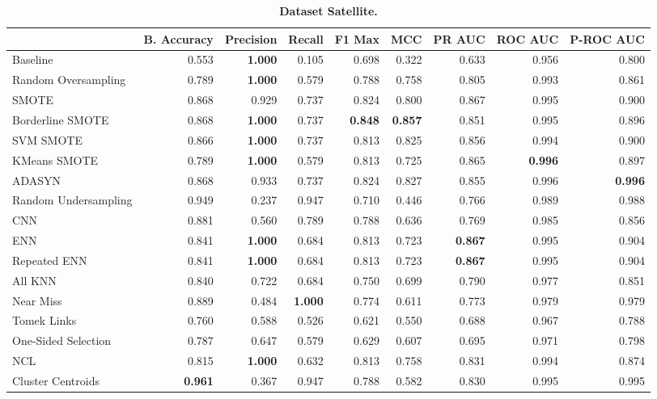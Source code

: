 \begin{table}[H]
    \centering
    \setlength\tabcolsep{2pt}
    \begin{tabularx}{\textwidth}{lRRRRRRRR}
        & B. Accuracy & Precision & Recall & F1 Max & MCC & PR AUC & ROC AUC & P-ROC AUC \\
        \midrule
        Baseline & 0.553 & \textbf{1.000} & 0.105 & 0.698 & 0.322 & 0.633 & 0.956 & 0.800 \\
        Random Oversampling & 0.789 & \textbf{1.000} & 0.579 & 0.788 & 0.758 & 0.805 & 0.993 & 0.861 \\
        SMOTE & 0.868 & 0.929 & 0.737 & 0.824 & 0.800 & 0.867 & 0.995 & 0.900 \\
        Borderline SMOTE & 0.868 & \textbf{1.000} & 0.737 & \textbf{0.848} & \textbf{0.857} & 0.851 & 0.995 & 0.896 \\
        SVM SMOTE & 0.866 & \textbf{1.000} & 0.737 & 0.813 & 0.825 & 0.856 & 0.994 & 0.900 \\
        KMeans SMOTE & 0.789 & \textbf{1.000} & 0.579 & 0.813 & 0.725 & 0.865 & \textbf{0.996} & 0.897 \\
        ADASYN & 0.868 & 0.933 & 0.737 & 0.824 & 0.827 & 0.855 & 0.996 & \textbf{0.996} \\
        Random Undersampling & 0.949 & 0.237 & 0.947 & 0.710 & 0.446 & 0.766 & 0.989 & 0.988 \\
        CNN & 0.881 & 0.560 & 0.789 & 0.788 & 0.636 & 0.769 & 0.985 & 0.856 \\
        ENN & 0.841 & \textbf{1.000} & 0.684 & 0.813 & 0.723 & \textbf{0.867} & 0.995 & 0.904 \\
        Repeated ENN & 0.841 & \textbf{1.000} & 0.684 & 0.813 & 0.723 & \textbf{0.867} & 0.995 & 0.904 \\
        All KNN & 0.840 & 0.722 & 0.684 & 0.750 & 0.699 & 0.790 & 0.977 & 0.851 \\
        Near Miss & 0.889 & 0.484 & \textbf{1.000} & 0.774 & 0.611 & 0.773 & 0.979 & 0.979 \\
        Tomek Links & 0.760 & 0.588 & 0.526 & 0.621 & 0.550 & 0.688 & 0.967 & 0.788 \\
        One-Sided Selection & 0.787 & 0.647 & 0.579 & 0.629 & 0.607 & 0.695 & 0.971 & 0.798 \\
        NCL & 0.815 & \textbf{1.000} & 0.632 & 0.813 & 0.758 & 0.831 & 0.994 & 0.874 \\
        Cluster Centroids & \textbf{0.961} & 0.367 & 0.947 & 0.788 & 0.582 & 0.830 & 0.995 & 0.995 \\
    \end{tabularx}
    \vspace{1mm}
    \caption{\textbf{Dataset Satellite.}}
\end{table}
